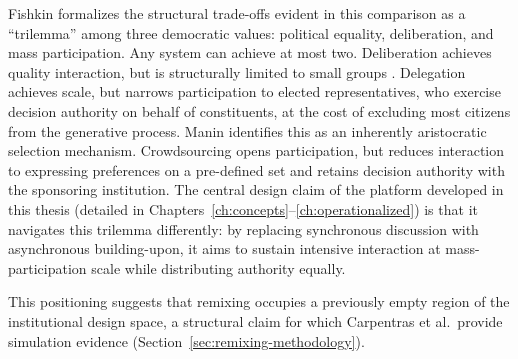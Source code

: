 \documentclass[a4paper, 12pt, twoside]{iviathesis}
\begin{document}
Fishkin \cite{fishkin2018democracy} formalizes the structural trade-offs evident in this comparison as a ``trilemma'' among three democratic values: political equality, deliberation, and mass participation. Any system can achieve at most two. Deliberation achieves quality interaction, but is structurally limited to small groups \cite{gastil1993}. Delegation achieves scale, but narrows participation to elected representatives, who exercise decision authority on behalf of constituents, at the cost of excluding most citizens from the generative process. Manin \cite{manin1997} identifies this as an inherently aristocratic selection mechanism. Crowdsourcing opens participation, but reduces interaction to expressing preferences on a pre-defined set and retains decision authority with the sponsoring institution. The central design claim of the platform developed in this thesis (detailed in Chapters~\ref{ch:concepts}--\ref{ch:operationalized}) is that it navigates this trilemma differently: by replacing synchronous discussion with asynchronous building-upon, it aims to sustain intensive interaction at mass-participation scale while distributing authority equally. 

This positioning suggests that remixing occupies a previously empty region of the institutional design space, a structural claim for which Carpentras et al.\ provide simulation evidence (Section~\ref{sec:remixing-methodology}).
\end{document}
